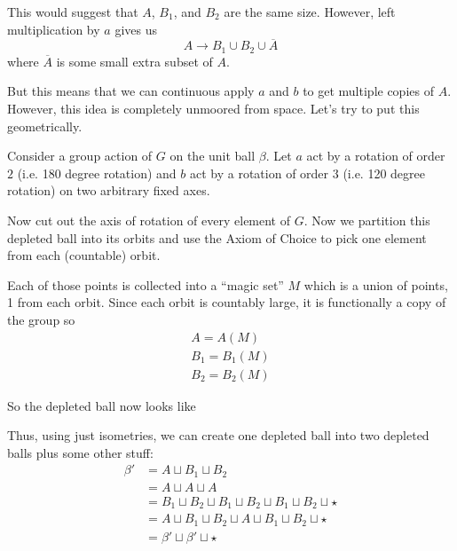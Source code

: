 \documentclass[12pt]{report}
\begin{document}
        This would suggest that $A$, $B_1$, and $B_2$ are the same size. However, left multiplication by $a$ gives us 
        \[A \longrightarrow B_1 \cup B_2 \cup \overline A\]
        where $\overline A$ is some small extra subset of $A$.

        But this means that we can continuous apply $a$ and $b$ to get multiple copies of $A$. However, this idea is completely unmoored from space. Let's try to put this geometrically. 

        Consider a group action of $G$ on the unit ball $\beta$. Let $a$ act by a rotation of order $2$ (i.e. 180 degree rotation) and $b$ act by a rotation of order $3$ (i.e. 120 degree rotation) on two arbitrary fixed axes. 

        Now cut out the axis of rotation of every element of $G$. Now we partition this depleted ball into its orbits and use the Axiom of Choice to pick one element from each (countable) orbit.

        Each of those points is collected into a ``magic set'' $M$ which is a union of points, 1 from each orbit. Since each orbit is countably large, it is functionally a copy of the group so 
        \begin{gather*}
            A = A(M)\\
            B_1 = B_1(M)\\
            B_2 = B_2(M)
        \end{gather*}

        So the depleted ball now looks like 
        \begin{center}
            \usetikzlibrary{calc}
        \end{center}

        Thus, using just isometries, we can create one depleted ball into two depleted balls plus some other stuff:
        \begin{align*}
            \beta' &= A\sqcup B_1 \sqcup B_2\\
                &= A \sqcup A \sqcup A\\
                &= B_1 \sqcup B_2 \sqcup B_1 \sqcup B_2 \sqcup  B_1 \sqcup B_2 \sqcup \star\\
                &= A \sqcup B_1 \sqcup B_2 \sqcup A \sqcup B_1 \sqcup B_2 \sqcup \star \\
                &= \beta' \sqcup \beta' \sqcup \star
        \end{align*}
\end{document}
